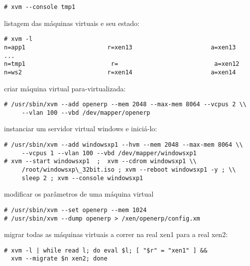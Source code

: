 \begin{Verbatim}[commandchars=\\\{\}]
# xvm --console tmp1
\end{Verbatim}

listagem das máquinas virtuais e seu estado:

\begin{Verbatim}[commandchars=\\\{\}]
# xvm -l
n=app1                       r=xen13                      a=xen13
...
n=tmp1                        r=                           a=xen12
n=ws2                        r=xen14                      a=xen14
\end{Verbatim}

criar máquina virtual para-virtualizada:

\begin{Verbatim}[commandchars=\\\{\}]
# /usr/sbin/xvm --add openerp --mem 2048 --max-mem 8064 --vcpus 2 \\
     --vlan 100 --vbd /dev/mapper/openerp
\end{Verbatim}

instanciar um servidor virtual windows e iniciá-lo:

\begin{Verbatim}[commandchars=\\\{\}]
# /usr/sbin/xvm --add windowsxp1 --hvm --mem 2048 --max-mem 8064 \\
     --vcpus 1 --vlan 100 --vbd /dev/mapper/windowsxp1
# xvm --start windowsxp1  ;  xvm --cdrom windowsxp1 \\
     /root/windowsxp\_32bit.iso ; xvm --reboot windowsxp1 -y ; \\
     sleep 2 ; xvm --console windowsxp1
\end{Verbatim}

modificar os parâmetros de uma máquina virtual

\begin{Verbatim}[commandchars=\\\{\}]
# /usr/sbin/xvm --set openerp --mem 1024
# /usr/sbin/xvm --dump openerp > /xen/openerp/config.xm
\end{Verbatim}

migrar todas as máquinas virtuais a correr na real xen1 para a real xen2:

\begin{Verbatim}[commandchars=\\\{\}]
# xvm -l | while read l; do eval $l; [ "$r" = "xen1" ] &&
  xvm --migrate $n xen2; done
\end{Verbatim}

